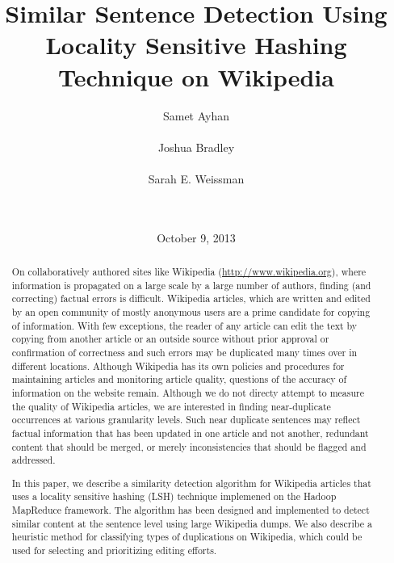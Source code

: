\documentclass{acm_proc_article-sp}
\begin{document}
\title{Similar Sentence Detection Using Locality Sensitive Hashing Technique on Wikipedia}


\author{
\alignauthor Samet Ayhan\\
       \\
\alignauthor Joshua Bradley\\
       \\
\alignauthor Sarah E. Weissman\\
       \\
       \\
}

\date{October 9, 2013}

\maketitle
\begin{abstract}
On collaboratively authored sites like Wikipedia (\url{http://www.wikipedia.org}), where information is propagated on a large scale by a large number of authors, finding (and correcting) factual errors is difficult. Wikipedia articles, which are written and edited by an open community of mostly anonymous users are a prime candidate for copying of information. With few exceptions, the reader of any article can edit the text by copying from another article or an outside source without prior approval or confirmation of correctness and such errors may be duplicated many times over in different locations. Although Wikipedia has its own policies and procedures for maintaining articles and monitoring article quality, questions of the accuracy of information on the website remain. Although we do not directy attempt to measure the quality of Wikipedia articles, we are interested in finding near-duplicate occurrences at various granularity levels. Such near duplicate sentences may reflect factual information that has been updated in one article and not another, redundant content that should be merged, or merely inconsistencies that should be flagged and addressed.

In this paper, we describe a similarity detection algorithm for Wikipedia articles that uses a locality sensitive hashing (LSH) technique implemened on the Hadoop MapReduce framework. The algorithm has been designed and implemented to detect similar content at the sentence level using large Wikipedia dumps. We also describe a heuristic method for classifying types of duplications on Wikipedia, which could be used for selecting and prioritizing editing efforts.
\end{abstract}
\end{document}
